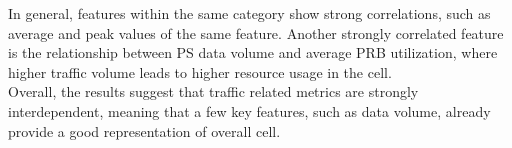 In general, features within the same category show strong correlations, such as average and peak values of the same feature. Another strongly correlated feature is the relationship between PS data volume and average PRB utilization, where higher traffic volume leads to higher resource usage in the cell. \\

Overall, the results suggest that traffic related metrics are strongly interdependent, meaning that a few key features, such as data volume, already provide a good representation of overall cell. \\
